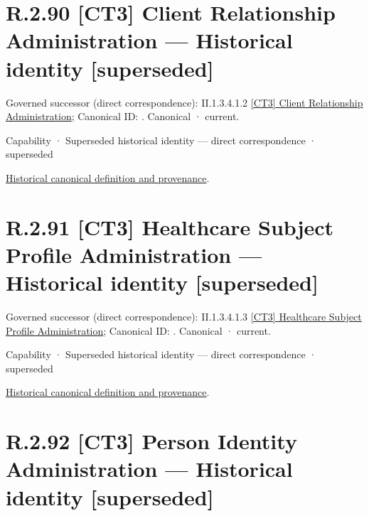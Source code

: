 \section*{R.2.90 [CT3] Client Relationship Administration — Historical identity [superseded]}
\label{navigation:R.2.90}

{\small Governed successor (direct correspondence): II.1.3.4.1.2 \hyperref[element:d682c11d3eb04770b1f20be478fd475e]{[CT3] Client Relationship Administration}; Canonical ID: \texttt{}. Canonical · current.}\par
\label{element:2c799ec0c4c74c97a75c12e949887b95}
{\small Capability · Superseded historical identity — direct correspondence · superseded}\par
\href{../../../../continuum/strategy/capability/2c799ec0c4c74c97a75c12e949887b95.md}{Historical canonical definition and provenance}.\par
\section*{R.2.91 [CT3] Healthcare Subject Profile Administration — Historical identity [superseded]}
\label{navigation:R.2.91}

{\small Governed successor (direct correspondence): II.1.3.4.1.3 \hyperref[element:df214b5499694b768eb4a7a175a9d471]{[CT3] Healthcare Subject Profile Administration}; Canonical ID: \texttt{}. Canonical · current.}\par
\label{element:d653c3247ddd49479f985f6b435933a0}
{\small Capability · Superseded historical identity — direct correspondence · superseded}\par
\href{../../../../continuum/strategy/capability/d653c3247ddd49479f985f6b435933a0.md}{Historical canonical definition and provenance}.\par
\section*{R.2.92 [CT3] Person Identity Administration — Historical identity [superseded]}
\label{navigation:R.2.92}

